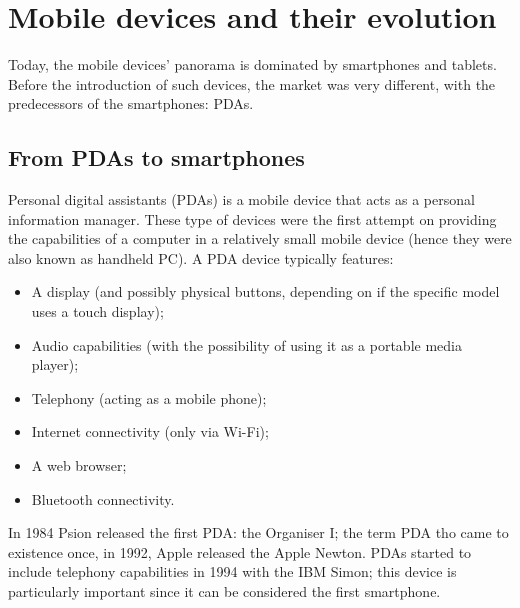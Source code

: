 \section{Mobile devices and their evolution}
Today, the mobile devices' panorama is dominated by smartphones and tablets. Before the introduction of such devices, the market was very different, with the predecessors of the smartphones: PDAs.

\subsection{From PDAs to smartphones}
Personal digital assistants (PDAs) is a mobile device that acts as a personal information manager. These type of devices were the first attempt on providing the capabilities of a computer in a relatively small mobile device (hence they were also known as handheld PC). A PDA device typically features:
\begin{itemize}
    \item A display (and possibly physical buttons, depending on if the specific model uses a touch display);
    \item Audio capabilities (with the possibility of using it as a portable media player);
    \item Telephony (acting as a mobile phone);
    \item Internet connectivity (only via Wi-Fi);
    \item A web browser;
    \item Bluetooth connectivity.
\end{itemize}

In 1984 Psion released the first PDA: the Organiser I; the term PDA tho came to existence once, in 1992, Apple released the Apple Newton. PDAs started to include telephony capabilities in 1994 with the IBM Simon; this device is particularly important since it can be considered the first smartphone.
\vspace{5mm}


